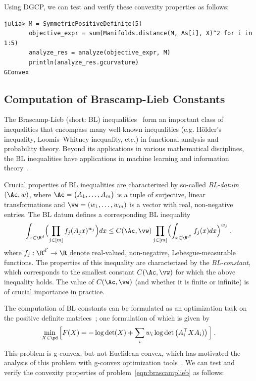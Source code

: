 \documentclass[twoside,11pt]{article}
\begin{document}
Using DGCP, we can test and verify these convexity properties as follows:

\begin{listing}[h!]
    \begin{verbatim}
julia> M = SymmetricPositiveDefinite(5)
       objective_expr = sum(Manifolds.distance(M, As[i], X)^2 for i in 1:5)
       analyze_res = analyze(objective_expr, M)
       println(analyze_res.gcurvature)
GConvex
    \end{verbatim}
\end{listing}


\subsection{Computation of Brascamp-Lieb Constants}
The Brascamp-Lieb (short: BL) inequalities~\citep{BL1,BL2} form an important class of inequalities that encompass many well-known inequalities (e.g.  Hölder's inequality,  Loomis–Whitney inequality, etc.) in functional analysis and probability theory. Beyond its applications in various mathematical disciplines, the BL inequalities have applications in machine learning and information theory~\citep{dvir2016rank,pmlr-v30-Hardt13,carlen2009subadditivity,liu2016smoothing}.

Crucial properties of BL inequalities are characterized by so-called  \emph{BL-datum} $(\Ac,w)$, where $\Ac = \big( A_1, \dots, A_m \big)$ is a tuple of surjective, linear transformations and  $\vw=(w_1,\dots,w_m)$ is a vector with real, non-negative entries. The BL datum defines a corresponding BL inequality 
\begin{equation}\label{eq:BL-inequ}
\int_{x \in \R^d} \Bigl( \prod_{j \in [m]} f_j (A_j x)^{w_j} \Bigr) dx 
\leq C(\Ac,\vw) \prod_{j \in [m]} \Bigl( \int_{x \in \R^{d'}} f_j (x) dx	\Bigr)^{w_j} \; ,
\end{equation}
where $f_j: \R^{d'} \rightarrow \R$ denote real-valued, non-negative, Lebesgue-measurable functions. The properties of this inequality are characterized by the \emph{BL-constant}, which corresponds to the smallest constant $C(\Ac,\vw)$ for which the above inequality holds. The value of $C(\Ac,\vw)$ (and whether it is finite or infinite) is of crucial importance in practice. 

The computation of BL constants can be formulated as 
an optimization task on the positive definite matrices~\citep{BL1,BL2}; one formulation of which is given by~\citep{sra_brascamplieb} 
\begin{equation}
\label{eqn:brascamplieb}
    \min_{X \in \pd} \Big[ F(X)=-\log \operatorname{det}(X)+\sum_i w_i \log \operatorname{det}\left(A_i^\top X A_i)\right) \Big] \; .
\end{equation}
This problem is g-convex, but not Euclidean convex, which has motivated the analysis of this problem with g-convex optimization tools~\citep{gurvits,garg2018algorithmic,burgisser2018efficient,thompson}.
We can test and verify the convexity properties of problem~\ref{eqn:brascamplieb} as follows:
\end{document}
